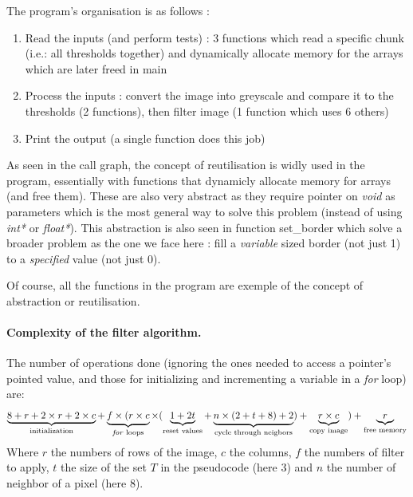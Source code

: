 \documentclass[a4paper]{report} %
\begin{document}
The program's organisation is as follows :
\begin{enumerate}
\item Read the inputs (and perform tests) : 3 functions which read a specific chunk (i.e.: all thresholds together) and dynamically allocate memory for the arrays which are later freed in main

\item Process the inputs : convert the image into greyscale and compare it to the thresholds (2 functions), then filter image (1 function which uses 6 others)

\item Print the output (a single function does this job)
\end{enumerate}

As seen in the call graph, the concept of reutilisation is widly used in the program, essentially with functions that dynamicly allocate memory for arrays (and free them).
These are also very abstract as they require pointer on \emph{void} as parameters which is the most general way to solve this problem (instead of using \emph{int*} or \emph{float*}).
This abstraction is also seen in function set\_border which solve a broader problem as the one we face here : fill a \emph{variable} sized border (not just 1) to a \emph{specified} value (not just 0).

Of course, all the functions in the program are exemple of the concept of abstraction or reutilisation.

\paragraph{Complexity of the filter algorithm.} The number of operations done (ignoring the ones needed to access a pointer's pointed value, and those for initializing and incrementing a variable in a \emph{for} loop) are:
\[
\underbrace{8 + r + 2 \times r + 2 \times c }_{\text{initialization}}
+
\underbrace{ f \times ( r \times c }_{\text{\emph{for} loops}}
\times ( 
\underbrace{1+2t}_{\text{reset values}}
+ 
\underbrace{n \times (2 + t + 8) + 2}_{\text{cycle through neigbors}}
) + 
\underbrace{ r \times c }_{\text{copy image}}
)+ 
\underbrace{ r }_{\text{free memory}}
\]
Where $r$ the numbers of rows of the image, $c$ the columns, $f$ the numbers of filter to apply, $t$ the size of the set $T$ in the pseudocode (here $3$) and $n$ the number of neighbor of a pixel (here $8$).
\end{document}
